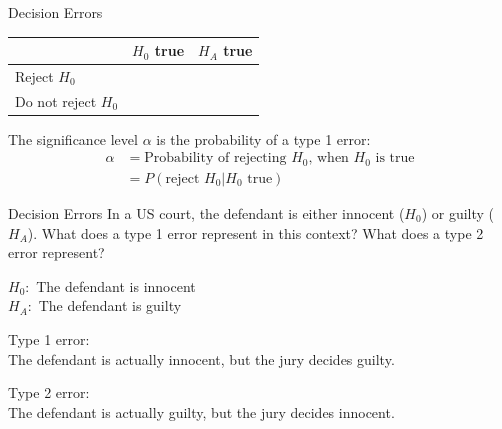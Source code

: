 \documentclass[fleqn, 10pt]{beamer}\usepackage[]{graphicx}\usepackage[]{color}
\begin{document}
\begin{frame}{Decision Errors}
\begin{table}[ht]
\begin{tabular}{p{3cm}|p{3cm}|p{3cm}}
 &$H_0$ true  &  $H_A$ true \\
\hline
Reject $H_0$ \newline &  & \\
\hline
Do not reject $H_0$ \newline  &  &\\ 
\end{tabular}
\end{table}

\bigskip
The significance level $\alpha$ is the probability of a type 1 error:
\begin{align*}
\alpha &= \text{Probability of rejecting $H_0$, when $H_0$ is true}\\
&= P(\text{reject } H_0 | H_0 \text{ true})
\end{align*}
\end{frame}

\begin{frame}{Decision Errors}
In a US court, the defendant is either innocent ($H_0$) or guilty ($H_A$).  What does a type 1 error represent in this context?  What does a type 2 error represent?\\
\bigskip

{\color{blue}
$H_0:$ The defendant is innocent\\
$H_A:$ The defendant is guilty\\
\bigskip

Type 1 error:\\ 
The defendant is actually innocent, but the jury decides guilty.\\
\medskip

Type 2 error:\\ 
The defendant is actually guilty, but the jury decides innocent.
}
\normalsize
\end{frame}
\end{document}
